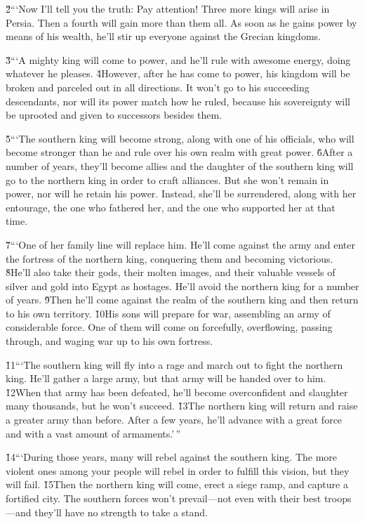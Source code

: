 \v{2}```Now I'll tell you the truth: Pay attention! Three more kings will arise in Persia. Then a fourth will gain more than them all. As soon as he gains power by means of his wealth, he'll stir up everyone against the Grecian kingdoms.

\v{3}```A mighty king will come to power, and he'll rule with awesome energy, doing whatever he pleases. \v{4}However, after he has come to power, his kingdom will be broken and parceled out in all directions. It won't go to his succeeding descendants, nor will its power match how he ruled, because his sovereignty will be uprooted and given to successors besides them.

\v{5}```The southern king will become strong, along with one of his officials, who will become stronger than he and rule over his own realm with great power. \v{6}After a number of years, they'll become allies and the daughter of the southern king will go to the northern king in order to craft alliances. But she won't remain in power, nor will he retain his power. Instead, she'll be surrendered, along with her entourage, the one who fathered her, and the one who supported her at that time.

\v{7}```One of her family line will replace him. He'll come against the army and enter the fortress of the northern king, conquering them and becoming victorious. \v{8}He'll also take their gods, their molten images, and their valuable vessels of silver and gold into Egypt as hostages. He'll avoid the northern king for a number of years. \v{9}Then he'll come against the realm of the southern king and then return to his own territory. \v{10}His sons will prepare for war, assembling an army of considerable force. One of them will come on forcefully, overflowing, passing through, and waging war up to his own fortress.

\v{11}```The southern king will fly into a rage and march out to fight the northern king. He'll gather a large army, but that army will be handed over to him. \v{12}When that army has been defeated, he'll become overconfident and slaughter many thousands, but he won't succeed. \v{13}The northern king will return and raise a greater army than before. After a few years, he'll advance with a great force and with a vast amount of armaments.'\,''

\v{14}```During those years, many will rebel against the southern king. The more violent ones among your people will rebel in order to fulfill this vision, but they will fail. \v{15}Then the northern king will come, erect a siege ramp, and capture a fortified city. The southern forces won't prevail---not even with their best troops---and they'll have no strength to take a stand.

